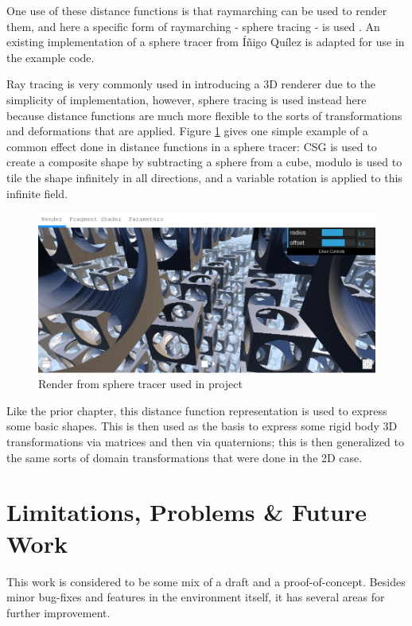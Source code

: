 \documentclass{sig-alternate-05-2015}
\begin{document}
One use of these distance functions is that raymarching can be used to
render them, and here a specific form of raymarching - sphere tracing
- is used
\cite{Hart,Hart1989,Quilez2008,Perlin1989,TexturingModelingText}.
An existing implementation of a sphere tracer from \'{I}\~{n}igo
Qu\'{i}lez is adapted for use in the example code.

Ray tracing is very commonly used in introducing a 3D renderer due to
the simplicity of implementation, however, sphere tracing is used
instead here because distance functions are much more flexible to the
sorts of transformations and deformations that are applied.  Figure
\ref{fig:sphere tracer} gives one simple example of a common effect
done in distance functions in a sphere tracer: CSG is used to create a
composite shape by subtracting a sphere from a cube, modulo is used to
tile the shape infinitely in all directions, and a variable rotation
is applied to this infinite field.

\begin{figure}
  \includegraphics[width=\textwidth]{screenshot_sphere_tracing.png}
  \caption{Render from sphere tracer used in project}
  \label{fig:sphere tracer}
\end{figure}

Like the prior chapter, this distance function representation is used
to express some basic shapes.  This is then used as the basis to
express some rigid body 3D transformations via matrices and then via
quaternions; this is then generalized to the same sorts of domain
transformations that were done in the 2D case.

\section{Limitations, Problems \& Future Work}

This work is considered to be some mix of a draft and a
proof-of-concept.  Besides minor bug-fixes and features in the
environment itself, it has several areas for further improvement.
\end{document}
